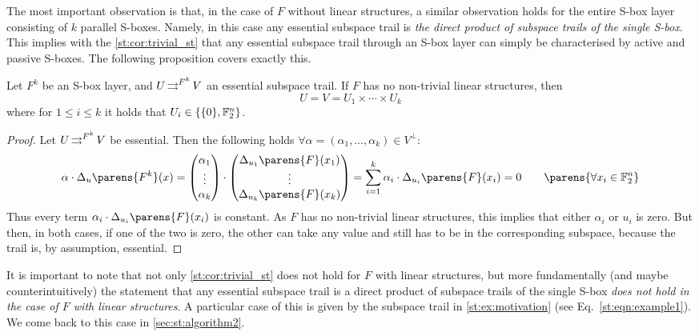 The most important observation is that, in the case of $F$ without linear structures, a similar observation holds for the entire S-box layer consisting of $k$ parallel S-boxes.
Namely, in this case any essential subspace trail is \emph{the direct product of subspace trails of the single S-box}.
This implies with the \cref{st:cor:trivial_st} that any essential subspace trail through an S-box layer can simply be characterised by active and passive S-boxes.
The following proposition covers exactly this.
\begin{proposition}\label{st:prop:no_ls}
    Let $F^k$ be an S-box layer, and $U \operatorname*{\rightrightarrows}^{F^k}_{} V$ an essential subspace trail.
    If $F$ has no non-trivial linear structures, then
    \begin{equation*}
        U = V = U_1 \times \cdots \times U_k
    \end{equation*}
    where for $1 \leqslant i \leqslant k$ it holds that $U_i \in \{ \{0\}, \mathbb{F}_2^n\}$.
\end{proposition}
\begin{proof}
    Let $U \operatorname*{\rightrightarrows}^{F^k}_{} V$ be essential.
    Then the following holds $\forall \alpha = (\alpha_1, \ldots, \alpha_k) \in V^\perp$:
    \begin{align*}
        \iprod{\alpha}{\Delta_{u}\parens{F^k}(x)}
        = \iprod{\begin{pmatrix}\alpha_1 \\ \vdots \\ \alpha_k\end{pmatrix}}{\begin{pmatrix} \Delta_{u_1}\parens{F}(x_1) \\ \vdots \\ \Delta_{u_k}\parens{F}(x_k)\end{pmatrix}}
        = \sum_{i=1}^k \iprod{\alpha_i}{\Delta_{u_i}\parens{F}(x_i)} = 0 \qquad \parens{\forall x_i \in \F_2^n}
    \end{align*}
    Thus every term $\iprod{\alpha_i}{\Delta_{u_i}\parens{F}(x_i)}$ is constant.
    As $F$ has no non-trivial linear structures, this implies that either $\alpha_i$ or $u_i$ is zero.
    But then, in both cases, if one of the two is zero, the other can take any value and still has to be in the corresponding subspace, because the trail is, by assumption, essential.
\end{proof}
It is important to note that not only \cref{st:cor:trivial_st} does not hold for $F$ with linear structures, but more fundamentally (and maybe counterintuitively) the statement that any essential subspace trail is a direct product of subspace trails of the single S-box \emph{does not hold in the case of $F$ with linear structures}.
A particular case of this is given by the subspace trail in \cref{st:ex:motivation} (see Eq.~\eqref{st:eqn:example1}).
We come back to this case in \cref{sec:st:algorithm2}.

